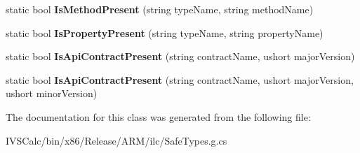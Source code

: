 \begin{DoxyCompactItemize}
static bool {\bfseries Is\+Method\+Present} (string type\+Name, string method\+Name)
\item 
\mbox{\label{class_windows_1_1_foundation_1_1_metadata_1_1_api_information_aa0236a143b0a7957254d0f59f21fef88}} 
static bool {\bfseries Is\+Property\+Present} (string type\+Name, string property\+Name)
\item 
\mbox{\label{class_windows_1_1_foundation_1_1_metadata_1_1_api_information_a673f6136fdd5584f69c299b8c5495aa5}} 
static bool {\bfseries Is\+Api\+Contract\+Present} (string contract\+Name, ushort major\+Version)
\item 
\mbox{\label{class_windows_1_1_foundation_1_1_metadata_1_1_api_information_ad08ace5ceb179078666548e256829344}} 
static bool {\bfseries Is\+Api\+Contract\+Present} (string contract\+Name, ushort major\+Version, ushort minor\+Version)
\end{DoxyCompactItemize}


The documentation for this class was generated from the following file\+:\begin{DoxyCompactItemize}
\item 
I\+V\+S\+Calc/bin/x86/\+Release/\+A\+R\+M/ilc/Safe\+Types.\+g.\+cs\end{DoxyCompactItemize}
